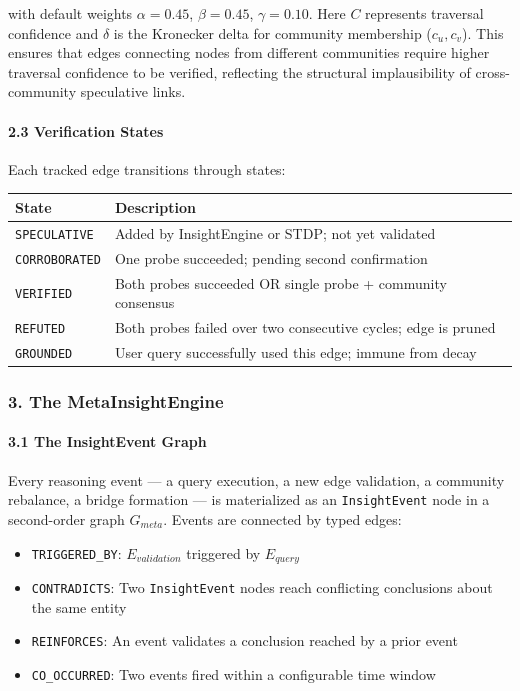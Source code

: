 with default weights $\alpha=0.45$, $\beta=0.45$, $\gamma=0.10$. Here $C$ represents traversal confidence and $\delta$ is the Kronecker delta for community membership ($c_u, c_v$). This ensures that edges connecting nodes from different communities require higher traversal confidence to be verified, reflecting the structural impla\-usibility of cross-community speculative links.

\paragraph{2.3 Verifi\-cation States}
Each tracked edge transitions through states:

\begin{center}
\begin{tabularx}{\columnwidth}{|>{\raggedright\arraybackslash}X|>{\raggedright\arraybackslash}X|}
\hline
State & Description \\ \hline
\texttt{SPECULATIVE} & Added by InsightEngine or STDP; not yet validated \\ \hline
\texttt{CORROBORATED} & One probe succeeded; pending second confi\-rmation \\ \hline
\texttt{VERIFIED} & Both probes succeeded OR single probe + community consensus \\ \hline
\texttt{REFUTED} & Both probes failed over two consecutive cycles; edge is pruned \\ \hline
\texttt{GROUNDED} & User query succe\-ssfully used this edge; immune from decay \\ \hline
\end{tabularx}
\end{center}

\subsubsection{3. The MetaInsightEngine}

\paragraph{3.1 The InsightEvent Graph}
Every reasoning event — a query execution, a new edge validation, a community rebalance, a bridge formation — is mater\-ialized as an \texttt{InsightEvent} node in a second-order graph $G_{meta}$. Events are connected by typed edges:

\begin{itemize}
\item \texttt{TRIGGERED\_BY}: $E_{validation}$ triggered by $E_{query}$
\item \texttt{CONTRADICTS}: Two \texttt{InsightEvent} nodes reach conflicting conclusions about the same entity
\item \texttt{REINFORCES}: An event validates a conclusion reached by a prior event
\item \texttt{CO\_OCCURRED}: Two events fired within a confi\-gurable time window

\end{itemize}
